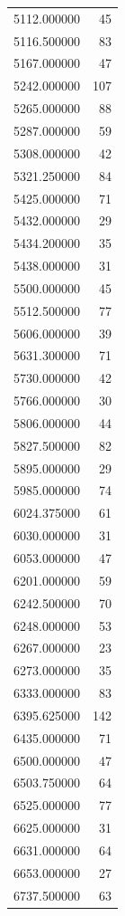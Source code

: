 \begin{tabular}{lr}
5112.000000   &    45 \\
5116.500000   &    83 \\
5167.000000   &    47 \\
5242.000000   &   107 \\
5265.000000   &    88 \\
5287.000000   &    59 \\
5308.000000   &    42 \\
5321.250000   &    84 \\
5425.000000   &    71 \\
5432.000000   &    29 \\
5434.200000   &    35 \\
5438.000000   &    31 \\
5500.000000   &    45 \\
5512.500000   &    77 \\
5606.000000   &    39 \\
5631.300000   &    71 \\
5730.000000   &    42 \\
5766.000000   &    30 \\
5806.000000   &    44 \\
5827.500000   &    82 \\
5895.000000   &    29 \\
5985.000000   &    74 \\
6024.375000   &    61 \\
6030.000000   &    31 \\
6053.000000   &    47 \\
6201.000000   &    59 \\
6242.500000   &    70 \\
6248.000000   &    53 \\
6267.000000   &    23 \\
6273.000000   &    35 \\
6333.000000   &    83 \\
6395.625000   &   142 \\
6435.000000   &    71 \\
6500.000000   &    47 \\
6503.750000   &    64 \\
6525.000000   &    77 \\
6625.000000   &    31 \\
6631.000000   &    64 \\
6653.000000   &    27 \\
6737.500000   &    63 \\

\end{tabular}
